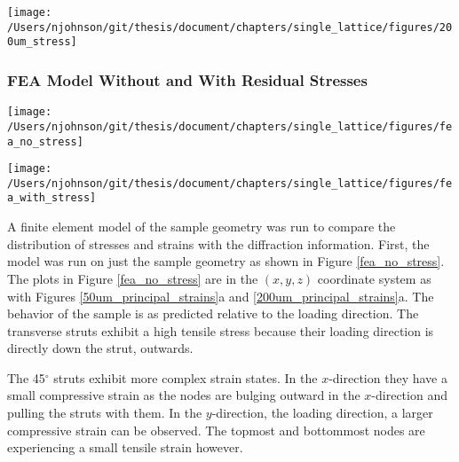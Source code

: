 \begin{figure*}
	\texttt{[image: /Users/njohnson/git/thesis/document/chapters/single\_lattice/figures/200um\_stress]}
	\caption{Principal stress in the sample with a) showing the $\sigma_{11}$ stress and b) showing the $\sigma_{22}$ stress.}
	\label{200um_stress}
\end{figure*}


\subsubsection{FEA Model Without and With Residual Stresses}
\begin{figure*}
	\texttt{[image: /Users/njohnson/git/thesis/document/chapters/single\_lattice/figures/fea\_no\_stress]}
	\caption{Results of the FEA simulation tested using only the material geometry and standard material properties for Ti-5553.}
	\label{fea_no_stress}
\end{figure*}

\begin{figure*}
	\texttt{[image: /Users/njohnson/git/thesis/document/chapters/single\_lattice/figures/fea\_with\_stress]}
	\caption{Results of the FEA simulation using the material geometry, the standard material properties for Ti-5553, and a gradient of residual stress applied across the sample in the build direction.}
	\label{fea_with_stress}
\end{figure*}

A finite element model of the sample geometry was run to compare the distribution of stresses and strains with the diffraction information. First, the model was run on just the sample geometry as shown in Figure \ref{fea_no_stress}. The plots in Figure \ref{fea_no_stress} are in the $(x,y,z)$ coordinate system as with Figures \ref{50um_principal_strains}a and \ref{200um_principal_strains}a. The behavior of the sample is as predicted relative to the loading direction. The transverse struts exhibit a high tensile stress because their loading direction is directly down the strut, outwards.

The 45$^\circ$ struts exhibit more complex strain states. In the $x$-direction they have a small compressive strain as the nodes are bulging outward in the $x$-direction and pulling the struts with them. In the $y$-direction, the loading direction, a larger compressive strain can be observed. The topmost and bottommost nodes are experiencing a small tensile strain however.

